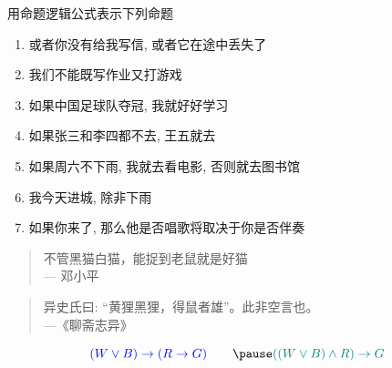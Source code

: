 \begin{frame}{}
  \begin{exampleblock}{用命题逻辑公式表示下列命题}
    \begin{enumerate}[<+->][(1)]
      \setlength{\itemsep}{8pt}
      \item 或者你没有给我写信, 或者它在途中丢失了
      \item 我们不能既写作业又打游戏
      \item 如果中国足球队夺冠, 我就好好学习
      \item 如果张三和李四都不去, 王五就去
      \item 如果周六不下雨, 我就去看电影, 否则就去图书馆
      \item 我今天进城, 除非下雨
      \item 如果你来了, 那么他是否唱歌将取决于你是否伴奏
    \end{enumerate}
  \end{exampleblock}
\end{frame}

\begin{frame}{}
  \begin{center}
    \begin{quote}
      \centering
      不管黑猫白猫，能捉到老鼠就是好猫 \\
      \hfill --- 邓小平
    \end{quote}
    \pause
    \begin{quote}
      异史氏曰: ``黄狸黑狸，得鼠者雄''。此非空言也。\\
      \hfill ---《聊斋志异》
    \end{quote}

    \pause
    \[
      \blue{(W \lor B) \to (R \to G)} \qquad \pause
      \teal{((W \lor B) \land R) \to G}
    \]
  \end{center}
\end{frame}

